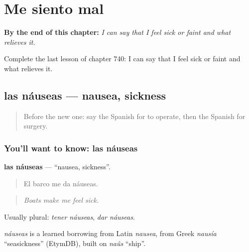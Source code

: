 
\chapter{Me siento mal}
\label{ch:es-me-siento-mal}

\begin{chapteropening}
\textbf{By the end of this chapter:} \emph{I can say that I feel sick or faint and what relieves it.}

Complete the last lesson of chapter 740: I can say that I feel sick or faint and what relieves it.
\end{chapteropening}

\section[las náuseas]{las náuseas — nausea, sickness}

\label{lesson:ES-C740-nauseas}



\begin{quote}
Before the new one: say the Spanish for to operate, then the Spanish for surgery.
\end{quote}

\subsection*{You'll want to know: las náuseas}
\textbf{las náuseas} — \textquotedblleft{}nausea, sickness\textquotedblright{}.

\begin{quote}
El barco me da náuseas.
\end{quote}

\begin{quote}
\emph{Boats make me feel sick.}
\end{quote}

Usually plural: \emph{tener náuseas}, \emph{dar náuseas}.

\begin{cousinweb}
\emph{náuseas} is a learned borrowing from Latin \emph{nausea}, from Greek \emph{nausía} \textquotedblleft{}seasickness\textquotedblright{} (EtymDB), built on \emph{naûs} \textquotedblleft{}ship\textquotedblright{}.
\end{cousinweb}


